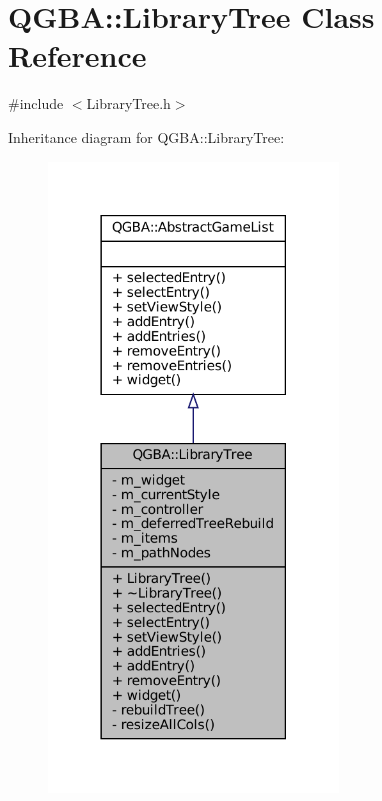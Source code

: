\hypertarget{class_q_g_b_a_1_1_library_tree}{}\section{Q\+G\+BA\+:\+:Library\+Tree Class Reference}
\label{class_q_g_b_a_1_1_library_tree}


{\ttfamily \#include $<$Library\+Tree.\+h$>$}



Inheritance diagram for Q\+G\+BA\+:\+:Library\+Tree\+:
\nopagebreak
\begin{figure}[H]
\begin{center}
\leavevmode
\includegraphics[width=218pt]{class_q_g_b_a_1_1_library_tree__inherit__graph}
\end{center}
\end{figure}


